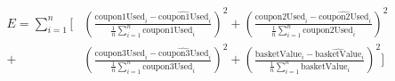 \documentclass{amsart}
\begin{document}
\begin{align*}
E = \sum_{i=1}^{n}\Bigg[ & \left(\frac{\text{coupon1Used}_{i} - \widehat{\text{coupon1Used}}_{i}}{\frac{1}{n}\sum_{i=1}^{n}\text{coupon1Used}_{i}}\right)^{2} + \left(\frac{\text{coupon2Used}_{i} - \widehat{\text{coupon2Used}}_{i}}{\frac{1}{n}\sum_{i=1}^{n}\text{coupon2Used}_{i}}\right)^{2} \\
+ & \left(\frac{\text{coupon3Used}_{i} - \widehat{\text{coupon3Used}}_{i}}{\frac{1}{n}\sum_{i=1}^{n}\text{coupon3Used}_{i}}\right)^{2} + \left(\frac{\text{basketValue}_{i} - \widehat{\text{basketValue}}_{i}}{\frac{1}{n}\sum_{i=1}^{n}\text{basketValue}_{i}}\right)^{2} \Bigg]
\end{align*}
\end{document}
